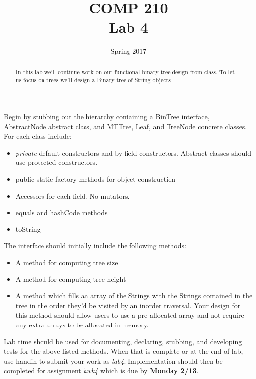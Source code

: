 \documentclass[nobib]{tufte-handout}
\title{COMP 210 \\ Lab 4}
\date{Spring 2017}
\begin{document}
\maketitle

\begin{abstract}
In this lab we'll continue work on our functional binary tree design from class. To let us focus on trees we'll design a Binary tree of String objects.
\end{abstract}

Begin by stubbing out the hierarchy containing a BinTree interface, AbstractNode abstract class, and MTTree, Leaf, and TreeNode concrete classes. For each class include:
\begin{itemize}
  \item \textit{private} default constructors and by-field constructors. Abstract classes should use protected constructors.
  \item public static factory methods for object construction
  \item Accessors for each field. No mutators.
  \item equals and hashCode methods
  \item toString
\end{itemize}

The interface should initially include the following methods:
\begin{itemize}
  \item A method for computing tree size
  \item A method for computing tree height
  \item A method which fills an array of the Strings with the Strings contained in the tree in the order they'd be visited by an inorder traversal. Your design for this method should allow users to use a pre-allocated array and not require any extra arrays to be allocated in memory.
\end{itemize}

Lab time should be used for documenting, declaring, stubbing, and developing tests for the above listed methods. When that is complete or at the end of lab, use handin to submit your work as \textit{lab4}. Implementation should then be completed for assignment \textit{hwk4} which is due by \textbf{Monday 2/13}.
\end{document}
